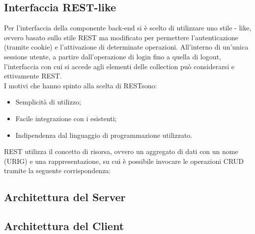 	\subsection{Interfaccia REST-like}
	\label{3.3}
	Per l'interfaccia della componente back-end si è scelto di utilizzare uno stile - like, ovvero basato sullo stile REST ma modificato per permettere l'autenticazione (tramite cookie) e l'attivazione di determinate operazioni. All'interno di un’unica sessione utente, a partire dall’operazione di login fino a quella di logout, l'interfaccia con cui si accede agli elementi delle collection può considerarsi e ettivamente REST.\\
I motivi che hanno spinto alla scelta di RESTsono:
\begin{itemize}
\item Semplicità di utilizzo;
\item Facile integrazione con i  esistenti; 
\item Indipendenza dal linguaggio di programmazione utilizzato.
\end{itemize}	
REST utilizza il concetto di risorsa, ovvero un aggregato di dati con un nome (URIG) e una rappresentazione, su cui è possibile invocare le operazioni CRUD tramite la seguente corrispondenza:
	\subsection{Architettura del Server}
	\label{3.4}
	\subsection{Architettura del Client}
	\label{3.5}
